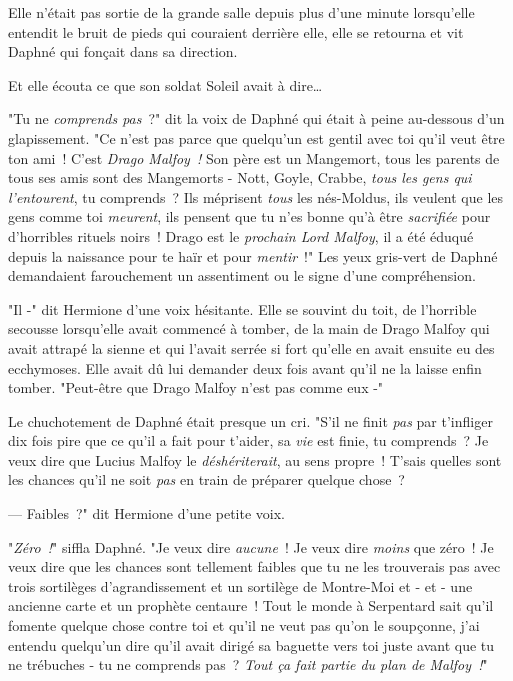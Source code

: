 Elle n'était pas sortie de la grande salle depuis plus d'une minute lorsqu'elle entendit le bruit de pieds qui couraient derrière elle, elle se retourna et vit Daphné qui fonçait dans sa direction.

Et elle écouta ce que son soldat Soleil avait à dire…

"Tu ne \emph{comprends pas}~?" dit la voix de Daphné qui était à peine au-dessous d'un glapissement. "Ce n'est pas parce que quelqu'un est gentil avec toi qu'il veut être ton ami~! C'est \emph{Drago Malfoy~!} Son père est un Mangemort, tous les parents de tous ses amis sont des Mangemorts - Nott, Goyle, Crabbe, \emph{tous les gens qui l'entourent}, tu comprends~? Ils méprisent \emph{tous} les nés-Moldus, ils veulent que les gens comme toi \emph{meurent}, ils pensent que tu n'es bonne qu'à être \emph{sacrifiée} pour d'horribles rituels noirs~! Drago est le \emph{prochain Lord Malfoy}, il a été éduqué depuis la naissance pour te haïr et pour \emph{mentir}~!" Les yeux gris-vert de Daphné demandaient farouchement un assentiment ou le signe d'une compréhension.

"Il -" dit Hermione d'une voix hésitante. Elle se souvint du toit, de l'horrible secousse lorsqu'elle avait commencé à tomber, de la main de Drago Malfoy qui avait attrapé la sienne et qui l'avait serrée si fort qu'elle en avait ensuite eu des ecchymoses. Elle avait dû lui demander deux fois avant qu'il ne la laisse enfin tomber. "Peut-être que Drago Malfoy n'est pas comme eux -"

Le chuchotement de Daphné était presque un cri. "S'il ne finit \emph{pas} par t'infliger dix fois pire que ce qu'il a fait pour t'aider, sa \emph{vie} est finie, tu comprends~? Je veux dire que Lucius Malfoy le \emph{déshériterait}, au sens propre~! T'sais quelles sont les chances qu'il ne soit \emph{pas} en train de préparer quelque chose~?

--- Faibles~?" dit Hermione d'une petite voix.

"\emph{Zéro~!}" siffla Daphné. "Je veux dire \emph{aucune}~! Je veux dire \emph{moins} que zéro~! Je veux dire que les chances sont tellement faibles que tu ne les trouverais pas avec trois sortilèges d'agrandissement et un sortilège de Montre-Moi et - et - une ancienne carte et un prophète centaure~! Tout le monde à Serpentard sait qu'il fomente quelque chose contre toi et qu'il ne veut pas qu'on le soupçonne, j'ai entendu quelqu'un dire qu'il avait dirigé sa baguette vers toi juste avant que tu ne trébuches - tu ne comprends pas~? \emph{Tout ça fait partie du plan de Malfoy~!}"

